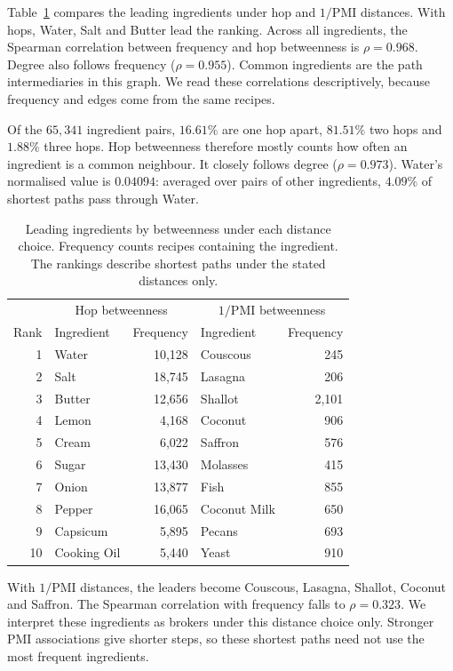 Table~\ref{tab:brokers} compares the leading ingredients under hop and
$1/\mathrm{PMI}$ distances. With hops, Water, Salt and Butter lead the
ranking. Across all ingredients, the Spearman correlation between frequency
and hop betweenness is $\rho=0.968$. Degree also follows frequency
($\rho=0.955$). Common ingredients are the path intermediaries in this
graph. We read these correlations descriptively, because frequency and
edges come from the same recipes.

Of the $65{,}341$ ingredient pairs, $16.61\%$ are one hop apart,
$81.51\%$ two hops and $1.88\%$ three hops. Hop betweenness therefore mostly
counts how often an ingredient is a common neighbour. It closely follows
degree ($\rho=0.973$). Water's normalised value is $0.04094$: averaged over
pairs of other ingredients, $4.09\%$ of shortest paths pass through Water.

\begin{table}[h]
\centering
\small
\begin{tabular}{r l r l r}
\toprule
& \multicolumn{2}{c}{Hop betweenness} & \multicolumn{2}{c}{$1/\mathrm{PMI}$ betweenness} \\
Rank & Ingredient & Frequency & Ingredient & Frequency \\
\midrule
1 & Water & 10{,}128 & Couscous & 245 \\
2 & Salt & 18{,}745 & Lasagna & 206 \\
3 & Butter & 12{,}656 & Shallot & 2{,}101 \\
4 & Lemon & 4{,}168 & Coconut & 906 \\
5 & Cream & 6{,}022 & Saffron & 576 \\
6 & Sugar & 13{,}430 & Molasses & 415 \\
7 & Onion & 13{,}877 & Fish & 855 \\
8 & Pepper & 16{,}065 & Coconut Milk & 650 \\
9 & Capsicum & 5{,}895 & Pecans & 693 \\
10 & Cooking Oil & 5{,}440 & Yeast & 910 \\
\bottomrule
\end{tabular}
\caption{Leading ingredients by betweenness under each distance choice.
Frequency counts recipes containing the ingredient. The rankings describe
shortest paths under the stated distances only.}
\label{tab:brokers}
\end{table}

With $1/\mathrm{PMI}$ distances, the leaders become Couscous, Lasagna,
Shallot, Coconut and Saffron. The Spearman correlation with frequency falls
to $\rho=0.323$. We interpret these ingredients as brokers under this
distance choice only. Stronger PMI associations give shorter steps, so
these shortest paths need not use the most frequent ingredients.

